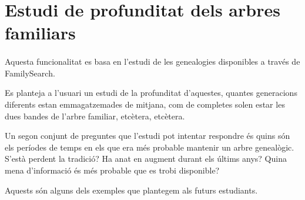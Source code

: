 \section{Estudi de profunditat dels arbres familiars}

    \paragraph{}
    Aquesta funcionalitat es basa en l'estudi de les genealogies disponibles a través de FamilySearch.

    Es planteja a l'usuari un estudi de la profunditat d'aquestes, quantes generacions diferents estan emmagatzemades de mitjana, com de completes solen estar les dues bandes de l'arbre familiar, etcètera, etcètera.

    Un segon conjunt de preguntes que l'estudi pot intentar respondre és quins són els períodes de temps en els que era més probable mantenir un arbre genealògic. S'està perdent la tradició? Ha anat en augment durant els últims anys? Quina mena d'informació és més probable que es trobi disponible?

    Aquests són alguns dels exemples que plantegem als futurs estudiants.
